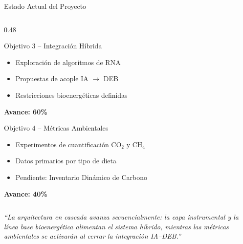 \documentclass[aspectratio=169, 11pt]{beamer}
\begin{document}
\begin{frame}{Estado Actual del Proyecto}
\begin{columns}[T,onlytextwidth]
\begin{column}{0.48\textwidth}

\begin{alertblock}{Objetivo 3 -- Integración Híbrida}
\scriptsize
\begin{itemize}
    \item Exploración de algoritmos de RNA
    \item Propuestas de acople IA $\rightarrow$ DEB
    \item Restricciones bioenergéticas definidas
\end{itemize}
\vspace{0.1cm}
\textcolor{orange!60!red}{\textbf{Avance: 60\%}}
\end{alertblock}

\vspace{0.12cm}

\begin{alertblock}{Objetivo 4 -- Métricas Ambientales}
\scriptsize
\begin{itemize}
    \item Experimentos de cuantificación CO$_2$ y CH$_4$
    \item Datos primarios por tipo de dieta
    \item Pendiente: Inventario Dinámico de Carbono
\end{itemize}
\vspace{0.1cm}
\textcolor{red!70!black}{\textbf{Avance: 40\%}}
\end{alertblock}

\end{column}

\end{columns}

\vspace{0.3cm}
\centering
\footnotesize
\textit{``La arquitectura en cascada avanza secuencialmente: la capa instrumental y la línea base bioenergética alimentan el sistema híbrido, mientras las métricas ambientales se activarán al cerrar la integración IA--DEB.''}

\end{frame}
\end{document}

